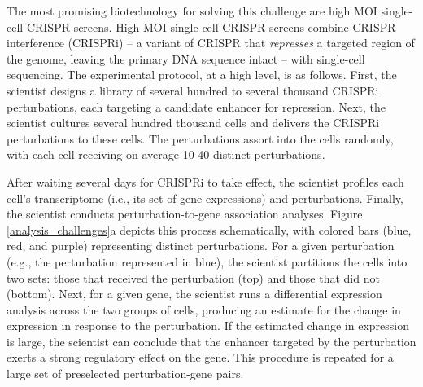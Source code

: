 \documentclass[12pt]{article}
\newcommand{\blue}[1]{\textcolor{blue}{#1}}
\begin{document}
The most promising biotechnology for solving this challenge are high MOI single-cell CRISPR screens. High MOI single-cell CRISPR screens combine CRISPR interference (CRISPRi) -- a variant of CRISPR that \textit{represses} a targeted region of the genome, leaving the primary DNA sequence intact  -- with single-cell sequencing. The experimental protocol, at a high level, is as follows. First, the scientist designs a library of several hundred to several thousand CRISPRi perturbations, each targeting a candidate enhancer for repression. Next, the scientist cultures several hundred thousand cells and delivers the CRISPRi perturbations to these cells. The perturbations assort into the cells randomly, with each cell receiving on average 10-40 distinct perturbations.

After waiting several days for CRISPRi to take effect, the scientist profiles each cell's transcriptome (i.e., its set of gene expressions) and perturbations. Finally, the scientist conducts perturbation-to-gene association analyses. Figure \ref{analysis_challenges}a depicts this process schematically, with colored bars (blue, red, and purple) representing distinct perturbations. For a given perturbation (e.g., the perturbation represented in blue), the scientist partitions the cells into two sets: those that received the perturbation (top) and those that did not (bottom). Next, for a given gene, the scientist runs a differential expression analysis across the two groups of cells, producing an estimate for the change in expression in response to the perturbation. If the estimated change in expression is large, the scientist can conclude that the enhancer targeted by the perturbation exerts a strong regulatory effect on the gene. This procedure is repeated for a large set of preselected perturbation-gene pairs.



\end{document}
